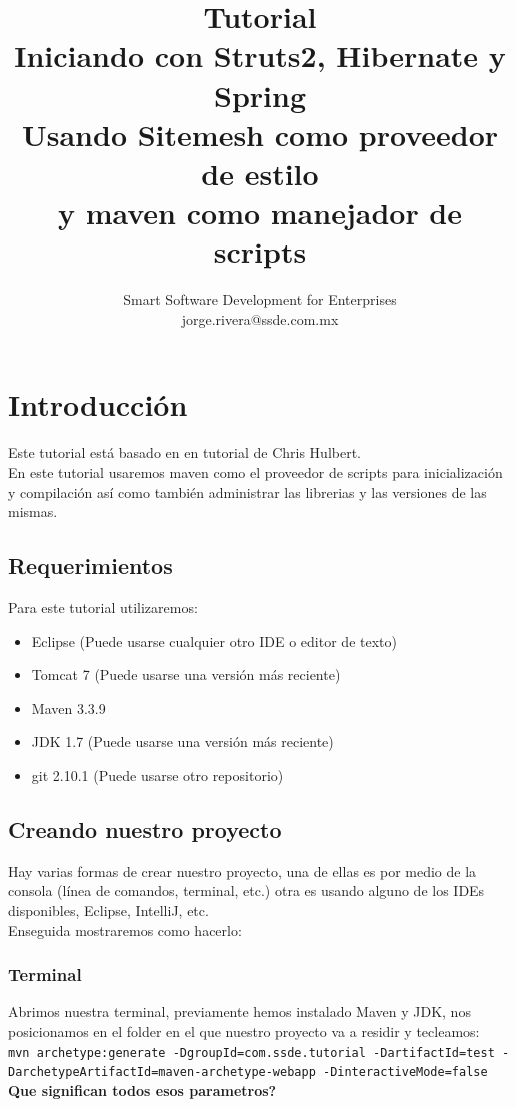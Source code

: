 \documentclass[12pt]{article}
\title{Tutorial\\Iniciando con Struts2, Hibernate y Spring\\Usando Sitemesh como proveedor de estilo\\y maven como manejador de scripts}
\author{Smart Software Development for Enterprises\\jorge.rivera@ssde.com.mx}
\begin{document}
\maketitle
\newpage
\tableofcontents
\newpage
\listoffigures
\newpage

    \section{Introducci\'on}
		Este tutorial est\'a basado en en tutorial de Chris Hulbert.
		\\
		En este tutorial usaremos maven como el proveedor de scripts para inicializaci\'on y compilaci\'on as\'i como tambi\'en administrar las librerias y las versiones de las mismas.

		\subsection{Requerimientos}
		Para este tutorial utilizaremos:
		\begin{itemize}
		\item Eclipse (Puede usarse cualquier otro IDE o editor de texto)
		\item Tomcat 7 (Puede usarse una versi\'on m\'as reciente)
		\item Maven 3.3.9
		\item JDK 1.7 (Puede usarse una versi\'on m\'as reciente)
		\item git 2.10.1 (Puede usarse otro repositorio)
		\end{itemize}

		\subsection{Creando nuestro proyecto}
		Hay varias formas de crear nuestro proyecto, una de ellas es por medio de la consola (l\'inea 
		de comandos, terminal, etc.) otra es usando alguno de los IDEs disponibles, Eclipse, IntelliJ,
		 etc.
		\\Enseguida mostraremos como hacerlo:

		\subsubsection{Terminal}
		
		Abrimos nuestra terminal, previamente hemos instalado Maven y JDK, nos posicionamos en el folder
		en el que nuestro proyecto va a residir y tecleamos:\\
		\linebreak
		\texttt{mvn archetype:generate -DgroupId=com.ssde.tutorial -DartifactId=test -DarchetypeArtifactId=maven-archetype-webapp -DinteractiveMode=false}\\
		\linebreak
		\textbf{Que significan todos esos parametros?}
\end{document}
